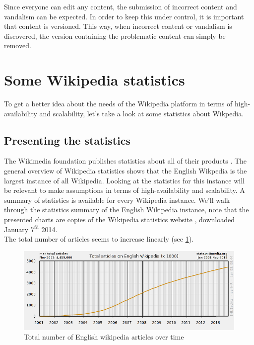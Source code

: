 \documentclass[12pt]{report}
\begin{document}
Since everyone can edit any content, the submission of incorrect
content and vandalism can be expected. In
order to keep this under control, it is important that content is
versioned.
This way, when incorrect content or vandalism is discovered, the
version containing the problematic content can simply be removed. \\

\section{Some Wikipedia statistics}
To get a better idea about the needs of the Wikipedia platform in
terms of high-availability and scalability, let's take a look at some
statistics about Wikpedia.

\subsection{Presenting the statistics}
The Wikimedia foundation publishes statistics about all of their
products \cite{stats_wikimedia}. The general overview of Wikipedia
statistics \cite{stats_wikipedia} shows that the English Wikpedia is
the largest instance of all Wikipedia. Looking at the statistics for
this instance will be relevant to make assumptions in terms of
high-availability and scalability.
A summary of statistics is available for every Wikipedia instance.
We'll walk through the statistics summary of the English Wikipedia
instance, note that the presented charts are copies of the Wikipedia
statistics website \cite{stats_wikipedia}, downloaded January $7^{th}$
2014.\\
The total number of articles seems to increase linearly (see \cref{wikipedia_nr_articles_over_time}).
\begin{figure}[h!]
  \caption{Total number of English wikipedia articles over time}
  \label{wikipedia_nr_articles_over_time}
  \centering
    \includegraphics[scale=0.5]{pics/wikipedia_nr_articles_over_time.png}
\end{figure}
\end{document}
